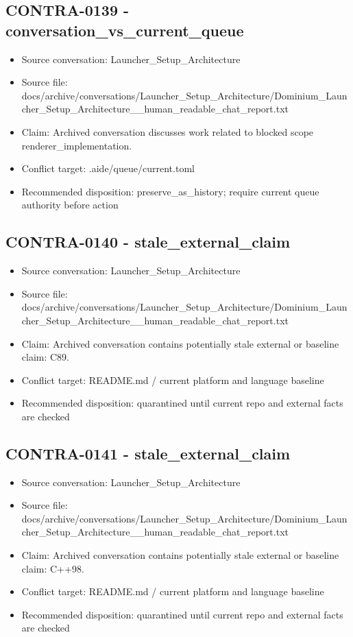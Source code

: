 \documentclass[11pt,a4paper]{report}
\begin{document}
\subsection{CONTRA-0139 - conversation\_vs\_current\_queue}

\begin{itemize}
\item Source conversation: Launcher\_Setup\_Architecture
\item Source file: docs/archive/conversations/Launcher\_Setup\_Architecture/Dominium\_Launcher\_Setup\_Architecture\_\_human\_readable\_chat\_report.txt
\item Claim: Archived conversation discusses work related to blocked scope renderer\_implementation.
\item Conflict target: .aide/queue/current.toml
\item Recommended disposition: preserve\_as\_history; require current queue authority before action
\end{itemize}

\subsection{CONTRA-0140 - stale\_external\_claim}

\begin{itemize}
\item Source conversation: Launcher\_Setup\_Architecture
\item Source file: docs/archive/conversations/Launcher\_Setup\_Architecture/Dominium\_Launcher\_Setup\_Architecture\_\_human\_readable\_chat\_report.txt
\item Claim: Archived conversation contains potentially stale external or baseline claim: C89.
\item Conflict target: README.md / current platform and language baseline
\item Recommended disposition: quarantined until current repo and external facts are checked
\end{itemize}

\subsection{CONTRA-0141 - stale\_external\_claim}

\begin{itemize}
\item Source conversation: Launcher\_Setup\_Architecture
\item Source file: docs/archive/conversations/Launcher\_Setup\_Architecture/Dominium\_Launcher\_Setup\_Architecture\_\_human\_readable\_chat\_report.txt
\item Claim: Archived conversation contains potentially stale external or baseline claim: C++98.
\item Conflict target: README.md / current platform and language baseline
\item Recommended disposition: quarantined until current repo and external facts are checked
\end{itemize}
\end{document}
